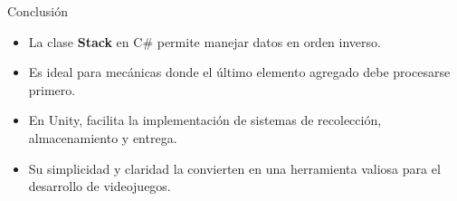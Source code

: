 \documentclass{beamer}
\begin{document}
\begin{frame}{Conclusión}
\begin{itemize}
    \item La clase \textbf{Stack} en C\# permite manejar datos en orden inverso.
    \item Es ideal para mecánicas donde el último elemento agregado debe procesarse primero.
    \item En Unity, facilita la implementación de sistemas de recolección, almacenamiento y entrega.
    \item Su simplicidad y claridad la convierten en una herramienta valiosa para el desarrollo de videojuegos.
\end{itemize}
\end{frame}
\end{document}
